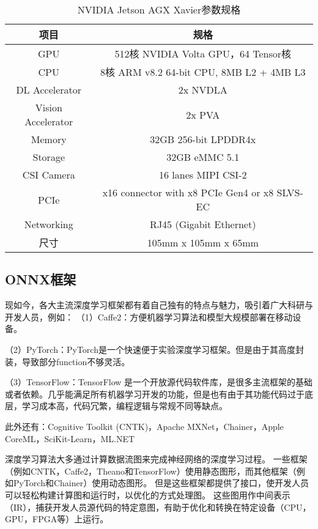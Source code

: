 \begin{table}[htbp]
    \caption{NVIDIA Jetson AGX Xavier参数规格}
    \vspace{0.5em}\centering\wuhao
    \begin{tabular}{cc}
    \toprule
    项目 & 规格\\
    \midrule
    GPU & 512核 NVIDIA Volta GPU，64 Tensor核\\
    CPU & 8核 ARM v8.2 64-bit CPU, 8MB L2 + 4MB L3\\
    DL Accelerator & 2x NVDLA\\
    Vision Accelerator & 2x PVA\\
    Memory & 32GB 256-bit LPDDR4x\\
    Storage & 32GB eMMC 5.1\\
    CSI Camera & 16 lanes MIPI CSI-2\\
    PCIe & x16 connector with x8 PCIe Gen4 or x8 SLVS-EC\\
    Networking & RJ45 (Gigabit Ethernet)\\
    尺寸 & 105mm x 105mm x 65mm\\
    \bottomrule
    \end{tabular}
    \label{t1}
\end{table}

\subsection{ONNX框架}
现如今，各大主流深度学习框架都有着自己独有的特点与魅力，吸引着广大科研与开发人员，例如：
（1）Caffe2：方便机器学习算法和模型大规模部署在移动设备。

（2）PyTorch：PyTorch是一个快速便于实验深度学习框架。但是由于其高度封装，导致部分function不够灵活。

（3）TensorFlow：TensorFlow 是一个开放源代码软件库，是很多主流框架的基础或者依赖。几乎能满足所有机器学习开发的功能，但是也有由于其功能代码过于底层，学习成本高，代码冗繁，编程逻辑与常规不同等缺点。

此外还有：Cognitive Toolkit (CNTK)，Apache MXNet，Chainer，Apple CoreML，SciKit-Learn，ML.NET

深度学习算法大多通过计算数据流图来完成神经网络的深度学习过程。 一些框架（例如CNTK，Caffe2，Theano和TensorFlow）使用静态图形，而其他框架（例如PyTorch和Chainer）使用动态图形。 但是这些框架都提供了接口，使开发人员可以轻松构建计算图和运行时，以优化的方式处理图。 这些图用作中间表示（IR），捕获开发人员源代码的特定意图，有助于优化和转换在特定设备（CPU，GPU，FPGA等）上运行。

